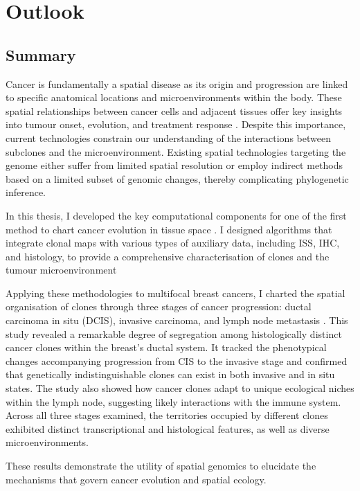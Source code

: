 \chapter{Outlook}
\label{sec:chapter-discussion}

\section{Summary}
Cancer is fundamentally a spatial disease as its origin and progression are linked to specific anatomical locations and microenvironments within the body. These spatial relationships between cancer cells and adjacent tissues offer key insights into tumour onset, evolution, and treatment response . Despite this importance, current technologies constrain our understanding of the interactions between subclones and the microenvironment. Existing spatial technologies targeting the genome either suffer from limited spatial resolution or employ indirect methods based on a limited subset of genomic changes, thereby complicating phylogenetic inference.

In this thesis, I developed the key computational components for one of the first method to chart cancer evolution in tissue space . 
I designed algorithms that integrate clonal maps with various types of auxiliary data, including \ac{ISS}, \ac{IHC}, and histology, to provide a comprehensive characterisation of clones and the tumour microenvironment 

Applying these methodologies to multifocal breast cancers, I charted the spatial organisation of clones through three stages of cancer progression: ductal carcinoma in situ (\ac{DCIS}), invasive carcinoma, and lymph node metastasis . This study revealed a remarkable degree of segregation among histologically distinct cancer clones within the breast's ductal system. It tracked the phenotypical changes accompanying progression from \ac{CIS} to the invasive stage and confirmed that genetically indistinguishable clones can exist in both invasive and in situ states. The study also showed how cancer clones adapt to unique ecological niches within the lymph node, suggesting likely interactions with the immune system. Across all three stages examined, the territories occupied by different clones exhibited distinct transcriptional and histological features, as well as diverse microenvironments.

These results demonstrate the utility of spatial genomics to elucidate the mechanisms that govern cancer evolution and spatial ecology.

